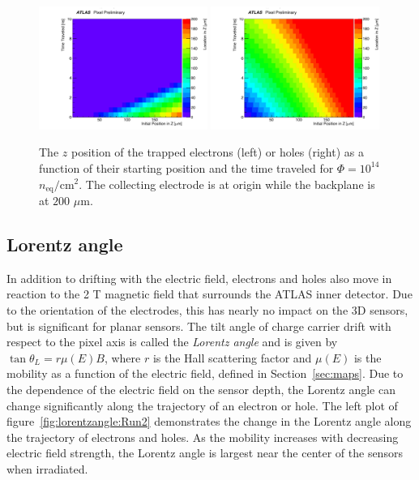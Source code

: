 \begin{figure}[!htpb]
\centering
\includegraphics[width=0.49\textwidth]{newdistance_maps_e1e14.pdf}
\includegraphics[width=0.49\textwidth]{newdistance_maps_h1e14.pdf}
\caption{The $z$ position of the trapped electrons (left) or holes (right) as a function of their starting position and the time traveled for $\Phi=10^{14}$ $n_\text{eq}/\text{cm}^2$.  The collecting electrode is at origin while the backplane is at $200$ $\mu$m.  }
\label{fig:posattrap}
\end{figure}

\subsection{Lorentz angle}
\label{sec:mapsLorentz}

In addition to drifting with the electric field, electrons and holes also move in reaction to the 2 T magnetic field that surrounds the ATLAS inner detector.  Due to the orientation of the electrodes, this has nearly no impact on the 3D sensors, but is significant for planar sensors.  The tilt angle of charge carrier drift with respect to the pixel axis is called the \textit{Lorentz angle} and is given by $\tan\theta_L=r\mu(E) B$, where $r$ is the Hall scattering factor and $\mu(E)$ is the mobility as a function of the electric field, defined in Section~\ref{sec:maps}.  Due to the dependence of the electric field on the sensor depth, the Lorentz angle can change significantly along the trajectory of an electron or hole.  The left plot of figure~\ref{fig:lorentzangle:Run2} demonstrates the change in the Lorentz angle along the trajectory of electrons and holes.  As the mobility increases with decreasing electric field strength, the Lorentz angle is largest near the center of the sensors when irradiated.

